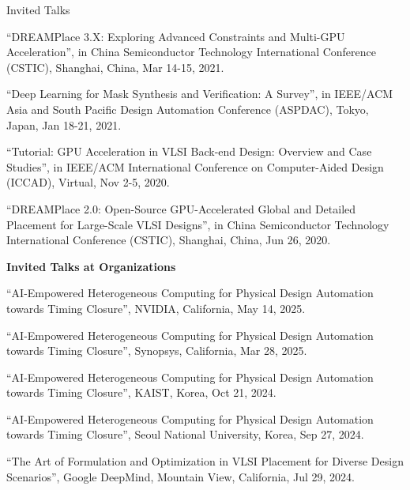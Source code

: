 \begin{rSection}{Invited Talks}
\begin{description}[font=\normalfont]
\item[{[4]}]{
``DREAMPlace 3.X: Exploring Advanced Constraints and Multi-GPU Acceleration'', in China Semiconductor Technology International Conference (CSTIC), Shanghai, China, Mar 14-15, 2021. 
}

\item[{[3]}]{
``Deep Learning for Mask Synthesis and Verification: A Survey'', in IEEE/ACM Asia and South Pacific Design Automation Conference (ASPDAC), Tokyo, Japan, Jan 18-21, 2021.
}

\item[{[2]}]{
``Tutorial: GPU Acceleration in VLSI Back-end Design: Overview and Case Studies'', in IEEE/ACM International Conference on Computer-Aided Design (ICCAD), Virtual, Nov 2-5, 2020. 
}

\item[{[1]}]{
``DREAMPlace 2.0: Open-Source GPU-Accelerated Global and Detailed Placement for Large-Scale VLSI Designs'', in China Semiconductor Technology International Conference (CSTIC), Shanghai, China, Jun 26, 2020. 
}

\end{description}

\textbf{Invited Talks at Organizations}
        
\begin{description}[font=\normalfont]

\item[{[15]}]{
``AI-Empowered Heterogeneous Computing for Physical Design Automation towards Timing Closure'', NVIDIA, California, May 14, 2025. 
}

\item[{[14]}]{
``AI-Empowered Heterogeneous Computing for Physical Design Automation towards Timing Closure'', Synopsys, California, Mar 28, 2025. 
}

\item[{[13]}]{
``AI-Empowered Heterogeneous Computing for Physical Design Automation towards Timing Closure'', KAIST, Korea, Oct 21, 2024. 
}

\item[{[12]}]{
``AI-Empowered Heterogeneous Computing for Physical Design Automation towards Timing Closure'', Seoul National University, Korea, Sep 27, 2024. 
}

\item[{[11]}]{
``The Art of Formulation and Optimization in VLSI Placement for Diverse Design Scenarios'', Google DeepMind, Mountain View, California, Jul 29, 2024. 
}


\end{description}
\end{rSection}

